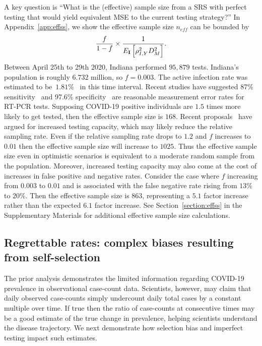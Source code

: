 \documentclass[11pt]{amsart}
\numberwithin{equation}{section}
\theoremstyle{plain}
\def\I{\bf I}
\begin{document}
A key question is ``What is the (effective) sample size from a SRS with perfect testing that would yield equivalent MSE to the current testing strategy?'' In Appendix~\ref{app:effss}, we show the effective sample size $n_{eff}$ can be bounded by
$$
\frac{f}{1-f} \times \frac{1}{E_{\I} \left[ \rho_{I,Y}^2 D_M^2 \right]}.
$$
Between April 25th to 29th 2020, Indiana performed $95,879$ tests.  Indiana's population is roughly $6.732$ million, so $f = 0.003$.  The active infection rate was estimated to be~$1.81\%$~\cite{Yiannoutsos2021} in this time interval. Recent studies have suggested 87\% sensitivity~\cite{Arevalo2020} and 97.6\% specificity~\cite{Cohen2020} are reasonable measurement error rates for RT-PCR tests. Supposing COVID-19 positive individuals are $1.5$ times more likely to get tested, then the effective sample size is $168$. Recent proposals~\citep{Siddarth2020} have argued for increased testing capacity, which may likely reduce the relative sampling rate.  Even if the relative sampling rate drops to $1.2$ and $f$ increases to $0.01$ then the effective sample size will increase to $1025$.  Thus the effective sample size even in optimistic scenarios is equivalent to a moderate random sample from the population.  Moreover, increased testing capacity may also come at the cost of increases in false positive and negative rates.  Consider the case where $f$ increasing from $0.003$ to $0.01$ and is associated with the false negative rate rising from $13\%$ to $20$\%.  Then the effective sample size is $863$, representing a $5.1$ factor increase rather than the expected $6.1$ factor increase. See Section~\ref{section:effss} in the Supplementary Materials for additional effective sample size calculations.


\subsection{Regrettable rates: complex biases resulting from self-selection}
\label{section:rates}

The prior analysis demonstrates the limited information regarding COVID-19 prevalence in observational case-count data.  Scientists, however, may claim that daily observed case-counts simply undercount daily total cases by a constant multiple over time.  If true then the ratio of case-counts at consecutive times may be a good estimate of the true change in prevalence, helping scientists understand the disease trajectory.  We next demonstrate how selection bias and imperfect testing impact such estimates.
\end{document}
